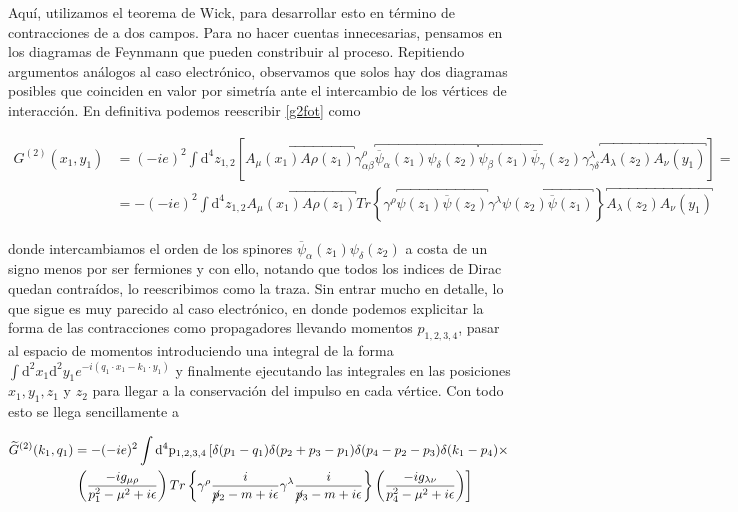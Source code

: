 \documentclass{article}
\numberwithin{equation}{section}
\begin{document}
Aquí, utilizamos el teorema de Wick, para desarrollar esto en término de contracciones de a dos campos. Para no hacer cuentas innecesarias, pensamos en los diagramas de Feynmann que pueden constribuir al proceso. Repitiendo argumentos análogos al caso electrónico, observamos que solos hay dos diagramas posibles que coinciden en valor por simetría ante el intercambio de los vértices de interacción. En definitiva podemos reescribir \ref{g2fot} como

\begin{equation}\label{key}
\begin{aligned}
G^{(2)}(x_{1},y_{1})&=(-ie)^{2}\int \mathrm{\mathrm{d^4}}z_{1,2}\left[\overbracket{A_{\mu}(x_{1})A{\rho}(z_1)} \gamma^{\rho}_{\alpha\beta} \overbracket{\overline{\psi}_{\alpha}(z_1)\psi_{\delta}(z_{2})}\overbracket{\psi_{\beta}(z_{1})\overline{\psi}_{\gamma}(z_2)} \gamma^{\lambda}_{\gamma\delta}\overbracket{A_{\lambda}(z_2)A_{\nu}(y_1)}\right]=\\
&=-(-ie)^{2}\int \mathrm{\mathrm{d^4}}z_{1,2}\overbracket{A_{\mu}(x_{1})A{\rho}(z_1)} Tr\left\{ \gamma^{\rho} \overbracket{\psi(z_{1})\overline{\psi}(z_2)} \gamma^{\lambda}\overbracket{\psi(z_{2})\overline{\psi}(z_1)}\right\}\overbracket{A_{\lambda}(z_2)A_{\nu}(y_1)}
\end{aligned}
\end{equation}

donde intercambiamos el orden de los spinores $ \overline{\psi}_{\alpha}(z_1)\psi_{\delta}(z_{2}) $ a costa de un signo menos por ser fermiones y con ello, notando que todos los indices de Dirac quedan contraídos, lo reescribimos como la traza. Sin entrar mucho en detalle, lo que sigue es muy parecido al caso electrónico, en donde podemos explicitar la forma de las contracciones como propagadores llevando momentos $ p_{1,2,3,4} $, pasar al espacio de momentos introduciendo una integral de la forma $ \int \mathrm{d^2}x_1\mathrm{d^2}y_1 e^{-i\left(q_1 \cdot x_1-k_1 \cdot y_1 \right)}$ y finalmente ejecutando las integrales en las posiciones $ x_1, y_1, z_1 $ y $ z_2 $ para llegar a la conservación del impulso en cada vértice. Con todo esto se llega sencillamente a

\begin{equation}\label{key}
\begin{aligned}
\widetilde{G}^{(2)}(k_{1},q_{1})&=-(-ie)^{2} \int \mathrm{\mathrm{d^4}p_{1,2,3,4}}  \left[  \delta (p_1 -q_1) \delta(p_2 + p_3 - p_1) \delta (p_4 - p_2 - p_3) \delta (k_1 - p_4) \times \right.\\
& \left. \left(\frac{-ig_{\mu \rho}}{p_1^2 - \mu^2 +i\epsilon}\right) Tr\left\{ \gamma^{\rho} \frac{i}{\cancel{p}_2 -m+i\epsilon} \gamma^{\lambda} \frac{i}{\cancel{p}_3 -m +i\epsilon}   \right\} \left(\frac{-ig_{\lambda \nu}}{p_4^2 - \mu^2 +i\epsilon}\right)\right] 
\end{aligned}
\end{equation}
\end{document}
